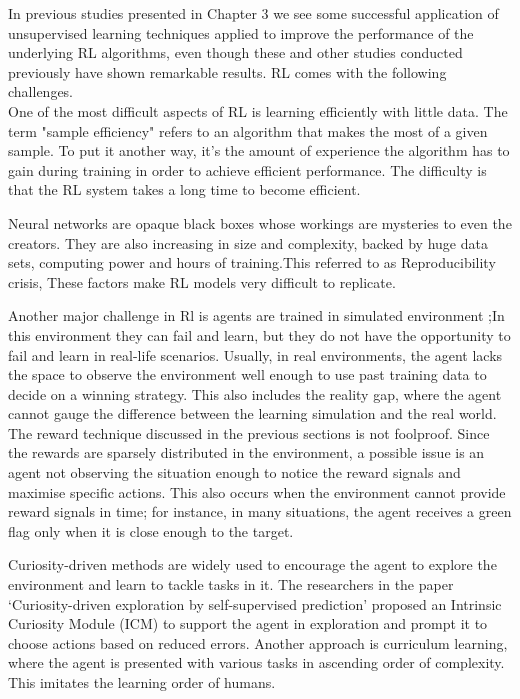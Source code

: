 In previous studies presented in Chapter 3 we see some successful application
of unsupervised learning techniques applied to improve the performance of the
underlying RL algorithms, even though these and other studies conducted
previously have shown remarkable results. RL comes with the following
challenges. \\

One of the most difficult aspects of RL is learning efficiently with little
data. The term "sample efficiency" refers to an algorithm that makes the most
of a given sample. To put it another way, it's the amount of experience the
algorithm has to gain during training in order to achieve efficient
performance. The difficulty is that the RL system takes a long time to become
efficient.

Neural networks are opaque black boxes whose workings are mysteries to even the
creators. They are also increasing in size and complexity, backed by huge data
sets, computing power and hours of training.This referred to as Reproducibility
crisis, These factors make RL models very difficult to replicate.  

Another major challenge in Rl is agents are trained in simulated environment
;In this environment they can fail and learn, but they do not have the
opportunity to fail and learn in real-life scenarios. Usually, in real
environments, the agent lacks the space to observe the environment well enough
to use past training data to decide on a winning strategy. This also includes
the reality gap, where the agent cannot gauge the difference between the
learning simulation and the real world.\\

The reward technique discussed in the previous sections is not foolproof. Since
the rewards are sparsely distributed in the environment, a possible issue is an
agent not observing the situation enough to notice the reward signals and
maximise specific actions. This also occurs when the environment cannot provide
reward signals in time; for instance, in many situations, the agent receives a
green flag only when it is close enough to the target. 

Curiosity-driven methods are widely used to encourage the agent to explore the
environment and learn to tackle tasks in it. The researchers in the paper
‘Curiosity-driven exploration by self-supervised prediction’ proposed an
Intrinsic Curiosity Module (ICM) to support the agent in exploration and prompt
it to choose actions based on reduced errors. Another approach is curriculum
learning, where the agent is presented with various tasks in ascending order of
complexity. This imitates the learning order of humans. 

